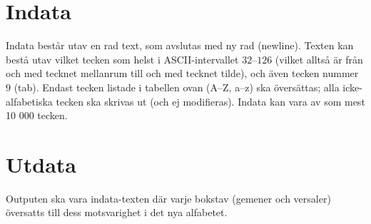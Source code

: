 \section*{Indata}
Indata består utav en rad text, som avslutas med ny rad (newline).
Texten kan bestå utav vilket tecken som helst i ASCII-intervallet $32$--$126$ (vilket alltså är från och med tecknet mellanrum till och med tecknet tilde), och även tecken nummer $9$ (tab).
Endast tecken listade i tabellen ovan (A--Z, a--z) ska översättas; alla icke-alfabetiska tecken ska skrivas ut (och ej modifieras).
Indata kan vara av som mest 10 000 tecken.
\section*{Utdata}
Outputen ska vara indata-texten där varje bokstav (gemener och versaler) översatts till dess motsvarighet i det nya alfabetet.
